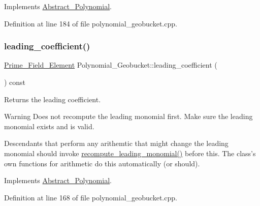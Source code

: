 Implements \hyperlink{class_abstract___polynomial_afb4895702dd56895a792850a831c2f51}{Abstract\+\_\+\+Polynomial}.



Definition at line 184 of file polynomial\+\_\+geobucket.\+cpp.

\mbox{\label{class_polynomial___geobucket_a1a4d713112fb492dc322d717b2387dbd}} 
\subsubsection{\texorpdfstring{leading\+\_\+coefficient()}{leading\_coefficient()}}
{\footnotesize\ttfamily \hyperlink{class_prime___field___element}{Prime\+\_\+\+Field\+\_\+\+Element} Polynomial\+\_\+\+Geobucket\+::leading\+\_\+coefficient (\begin{DoxyParamCaption}{ }\end{DoxyParamCaption}) const\hspace{0.3cm}{\ttfamily [virtual]}}



Returns the leading coefficient. 

\begin{DoxyWarning}{Warning}
Does not recompute the leading monomial first. Make sure the leading monomial exists and is valid.

Descendants that perform any arithemtic that might change the leading monomial should invoke \hyperlink{class_polynomial___geobucket_ab57dbe8d5f0d3860997775d9f354ab0c}{recompute\+\_\+leading\+\_\+monomial()} before this. The class's own functions for arithmetic do this automatically (or should). 
\end{DoxyWarning}


Implements \hyperlink{class_abstract___polynomial_a511ce8e997fe3fd1141293d256e25fad}{Abstract\+\_\+\+Polynomial}.



Definition at line 168 of file polynomial\+\_\+geobucket.\+cpp.

\mbox{\label{class_polynomial___geobucket_a98df9b7c843b0b375af0727ef1f54a80}} 
